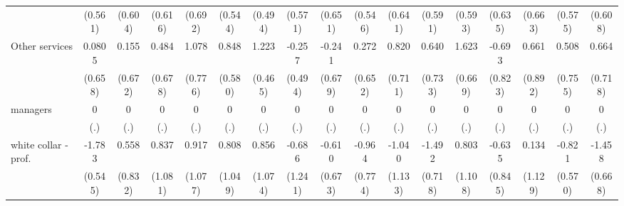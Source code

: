 {\begin{tabular}{l*{16}{c}}
                    &     (0.561)         &     (0.604)         &     (0.616)         &     (0.692)         &     (0.544)         &     (0.494)         &     (0.571)         &     (0.651)         &     (0.546)         &     (0.641)         &     (0.591)         &     (0.593)         &     (0.635)         &     (0.663)         &     (0.575)         &     (0.608)         \\
[1em]
Other services      &      0.0805         &       0.155         &       0.484         &       1.078         &       0.848         &       1.223\sym{**} &      -0.257         &      -0.241         &       0.272         &       0.820         &       0.640         &       1.623\sym{*}  &      -0.693         &       0.661         &       0.508         &       0.664         \\
                    &     (0.658)         &     (0.672)         &     (0.678)         &     (0.776)         &     (0.580)         &     (0.465)         &     (0.494)         &     (0.679)         &     (0.652)         &     (0.711)         &     (0.733)         &     (0.669)         &     (0.823)         &     (0.892)         &     (0.755)         &     (0.718)         \\
[1em]
managers            &           0         &           0         &           0         &           0         &           0         &           0         &           0         &           0         &           0         &           0         &           0         &           0         &           0         &           0         &           0         &           0         \\
                    &         (.)         &         (.)         &         (.)         &         (.)         &         (.)         &         (.)         &         (.)         &         (.)         &         (.)         &         (.)         &         (.)         &         (.)         &         (.)         &         (.)         &         (.)         &         (.)         \\
[1em]
white collar - prof.&      -1.783\sym{**} &       0.558         &       0.837         &       0.917         &       0.808         &       0.856         &      -0.686         &      -0.610         &      -0.964         &      -1.040         &      -1.492\sym{*}  &       0.803         &      -0.635         &       0.134         &      -0.821         &      -1.458\sym{*}  \\
                    &     (0.545)         &     (0.832)         &     (1.081)         &     (1.077)         &     (1.049)         &     (1.074)         &     (1.241)         &     (0.673)         &     (0.774)         &     (1.133)         &     (0.718)         &     (1.108)         &     (0.845)         &     (1.129)         &     (0.570)         &     (0.668)         \\

\end{tabular}}
